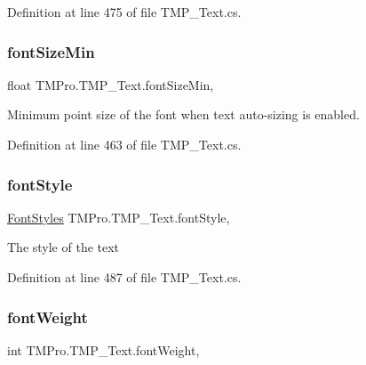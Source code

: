 Definition at line 475 of file T\+M\+P\+\_\+\+Text.\+cs.

\mbox{\label{class_t_m_pro_1_1_t_m_p___text_ab6642b203f0de62e49407ce5caada06d}} 
\subsubsection{\texorpdfstring{fontSizeMin}{fontSizeMin}}
{\footnotesize\ttfamily float T\+M\+Pro.\+T\+M\+P\+\_\+\+Text.\+font\+Size\+Min\hspace{0.3cm}{\ttfamily [get]}, {\ttfamily [set]}}



Minimum point size of the font when text auto-\/sizing is enabled. 



Definition at line 463 of file T\+M\+P\+\_\+\+Text.\+cs.

\mbox{\label{class_t_m_pro_1_1_t_m_p___text_af2e472645f4e0ab2f33ab3236def7dc4}} 
\subsubsection{\texorpdfstring{fontStyle}{fontStyle}}
{\footnotesize\ttfamily \mbox{\hyperlink{namespace_t_m_pro_aedf79b6e7e2ce2b9c9ac84e790596e7c}{Font\+Styles}} T\+M\+Pro.\+T\+M\+P\+\_\+\+Text.\+font\+Style\hspace{0.3cm}{\ttfamily [get]}, {\ttfamily [set]}}



The style of the text 



Definition at line 487 of file T\+M\+P\+\_\+\+Text.\+cs.

\mbox{\label{class_t_m_pro_1_1_t_m_p___text_a571c8cac097b25de7c9cea8da1c27d47}} 
\subsubsection{\texorpdfstring{fontWeight}{fontWeight}}
{\footnotesize\ttfamily int T\+M\+Pro.\+T\+M\+P\+\_\+\+Text.\+font\+Weight\hspace{0.3cm}{\ttfamily [get]}, {\ttfamily [set]}}



